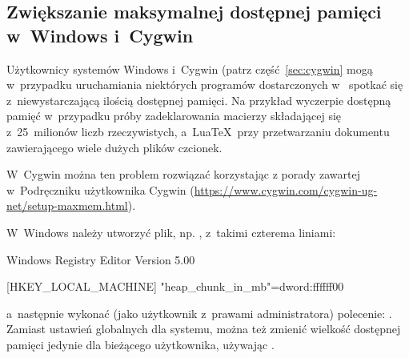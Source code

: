 \documentclass{article}
\begin{document}
\subsection{Zwiększanie maksymalnej  dostępnej pamięci
w~Windows i~Cygwin}
\label{sec:cygwin-maxmem}

Użytkownicy systemów Windows i~Cygwin (patrz część~\ref{sec:cygwin} mogą w~przypadku uruchamiania niektórych programów dostarczonych w~\TL{} spotkać się  z~niewystarczającą
ilością dostępnej pamięci.  Na przykład  wyczerpie dostępną pamięć
w~przypadku próby zadeklarowania macierzy składającej się  z~25~milionów liczb
rzeczywistych, a~Lua\TeX\ przy przetwarzaniu dokumentu zawierającego wiele
dużych plików czcionek.

W~Cygwin można ten problem rozwiązać korzystając z porady zawartej
w~Podręczniku użytkownika Cygwin
(\url{https://www.cygwin.com/cygwin-ug-net/setup-maxmem.html}).

W~Windows należy utworzyć plik, np. , z~takimi czterema liniami:

\begin{sverbatim}
Windows Registry Editor Version 5.00

[HKEY_LOCAL_MACHINE\Software\Cygwin]
"heap_chunk_in_mb"=dword:ffffff00
\end{sverbatim}

\noindent a~następnie wykonać (jako użytkownik z~prawami administratora)
polecenie: .  Zamiast ustawień globalnych dla
systemu, można też zmienić wielkość dostępnej pamięci jedynie dla bieżącego
użytkownika, używając .
\end{document}

